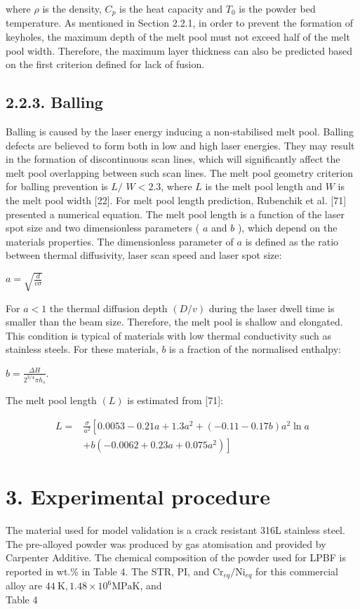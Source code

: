 \documentclass[10pt]{article}
\begin{document}
where $\rho$ is the density, $C_{p}$ is the heat capacity and $T_{0}$ is the powder bed temperature. As mentioned in Section 2.2.1, in order to prevent the formation of keyholes, the maximum depth of the melt pool must not exceed half of the melt pool width. Therefore, the maximum layer thickness can also be predicted based on the first criterion defined for lack of fusion.

\subsection*{2.2.3. Balling}
Balling is caused by the laser energy inducing a non-stabilised melt pool. Balling defects are believed to form both in low and high laser energies. They may result in the formation of discontinuous scan lines, which will significantly affect the melt pool overlapping between such scan lines. The melt pool geometry criterion for balling prevention is $L /$ $W<2.3$, where $L$ is the melt pool length and $W$ is the melt pool width [22]. For melt pool length prediction, Rubenchik et al. [71] presented a numerical equation. The melt pool length is a function of the laser spot size and two dimensionless parameters ( $a$ and $b$ ), which depend on the materials properties. The dimensionless parameter of $a$ is defined as the ratio between thermal diffusivity, laser scan speed and laser spot size:

$a=\sqrt{\frac{d}{v \sigma}}$

For $a<1$ the thermal diffusion depth $(D / v)$ during the laser dwell time is smaller than the beam size. Therefore, the melt pool is shallow and elongated. This condition is typical of materials with low thermal conductivity such as stainless steels. For these materials, $b$ is a fraction of the normalised enthalpy:

$b=\frac{\Delta H}{2^{3 / 4} \pi h_{s}}$.

The melt pool length $(L)$ is estimated from [71]:


\begin{align*}
L= & \frac{\sigma}{a^{2}}\left[0.0053-0.21 a+1.3 a^{2}+(-0.11-0.17 b) a^{2} \ln a\right. \\
& \left.+b\left(-0.0062+0.23 a+0.075 a^{2}\right)\right] \tag{14}
\end{align*}


\section*{3. Experimental procedure}
The material used for model validation is a crack resistant 316L stainless steel. The pre-alloyed powder was produced by gas atomisation and provided by Carpenter Additive. The chemical composition of the powder used for LPBF is reported in wt.\% in Table 4. The STR, PI, and $\mathrm{Cr}_{e q} / \mathrm{Ni}_{e q}$ for this commercial alloy are $44 \mathrm{~K}, 1.48 \times 10^{6} \mathrm{MPa} \mathrm{K}$, and\\
Table 4
\end{document}
